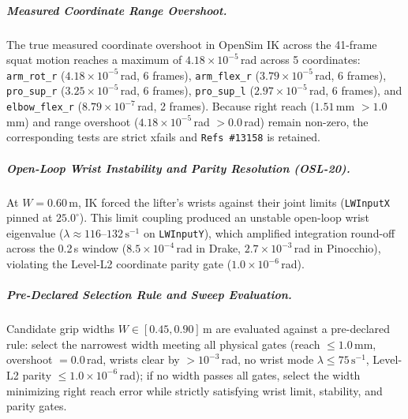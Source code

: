 \documentclass[11pt,a4paper]{article}
\begin{document}
\subparagraph{Measured Coordinate Range Overshoot.}
The true measured coordinate overshoot in OpenSim IK across the 41-frame squat motion reaches a maximum of
$4.18\times 10^{-5}$\,rad across 5 coordinates:
\texttt{arm\_rot\_r} ($4.18\times 10^{-5}$\,rad, 6 frames),
\texttt{arm\_flex\_r} ($3.79\times 10^{-5}$\,rad, 6 frames),
\texttt{pro\_sup\_r} ($3.25\times 10^{-5}$\,rad, 6 frames),
\texttt{pro\_sup\_l} ($2.97\times 10^{-5}$\,rad, 6 frames), and
\texttt{elbow\_flex\_r} ($8.79\times 10^{-7}$\,rad, 2 frames).
Because right reach ($1.51$\,mm $> 1.0$\,mm) and range overshoot ($4.18\times 10^{-5}$\,rad $> 0.0$\,rad)
remain non-zero, the corresponding tests are strict xfails and \texttt{Refs \#13158} is retained.

\subparagraph{Open-Loop Wrist Instability and Parity Resolution (OSL-20).}
At $W = 0.60$\,m, IK forced the lifter's wrists against their joint limits (\texttt{LWInputX}
pinned at $25.0^\circ$). This limit coupling produced an unstable open-loop wrist eigenvalue
($\lambda \approx 116$--$132\,\mathrm{s}^{-1}$ on \texttt{LWInputY}), which amplified integration
round-off across the 0.2\,s window ($8.5\times 10^{-4}$\,rad in Drake, $2.7\times 10^{-3}$\,rad
in Pinocchio), violating the Level-L2 coordinate parity gate ($1.0\times 10^{-6}$\,rad).

\subparagraph{Pre-Declared Selection Rule and Sweep Evaluation.}
Candidate grip widths $W \in [0.45, 0.90]$\,m are evaluated against a pre-declared rule: select the
narrowest width meeting all physical gates (reach $\le 1.0$\,mm, overshoot $= 0.0$\,rad, wrists clear
by $> 10^{-3}$\,rad, no wrist mode $\lambda \le 75\,\mathrm{s}^{-1}$, Level-L2 parity $\le 1.0\times 10^{-6}$\,rad);
if no width passes all gates, select the width minimizing right reach error while strictly satisfying wrist
limit, stability, and parity gates.
\end{document}

